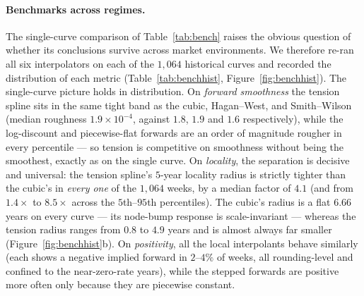 \documentclass[10pt]{article}
\begin{document}
\paragraph{Benchmarks across regimes.} The single-curve comparison of Table~\ref{tab:bench}
raises the obvious question of whether its conclusions survive across market environments. We
therefore re-ran all six interpolators on each of the $1{,}064$ historical curves and recorded
the distribution of each metric (Table~\ref{tab:benchhist}, Figure~\ref{fig:benchhist}). The
single-curve picture holds in distribution. On \emph{forward smoothness} the tension spline sits
in the same tight band as the cubic, Hagan--West, and Smith--Wilson (median roughness
$1.9\times10^{-4}$, against $1.8$, $1.9$ and $1.6$ respectively), while the log-discount and
piecewise-flat forwards are an order of magnitude rougher in every percentile --- so tension is
competitive on smoothness without being the smoothest, exactly as on the single curve. On
\emph{locality}, the separation is decisive and universal: the tension spline's $5$-year
locality radius is strictly tighter than the cubic's in \emph{every one} of the $1{,}064$ weeks,
by a median factor of $4.1$ (and from $1.4\times$ to $8.5\times$ across the $5$th--$95$th
percentiles). The cubic's radius is a flat $6.66$ years on every curve --- its node-bump response
is scale-invariant --- whereas the tension radius ranges from $0.8$ to $4.9$ years and is almost
always far smaller (Figure~\ref{fig:benchhist}b). On \emph{positivity}, all the local
interpolants behave similarly (each shows a negative implied forward in $2$--$4\%$ of weeks, all
rounding-level and confined to the near-zero-rate years), while the stepped forwards are positive
more often only because they are piecewise constant.
\end{document}
